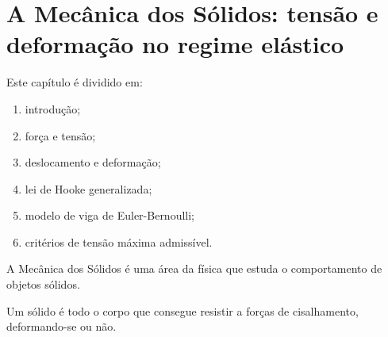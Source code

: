 \chapter{A Mecânica dos Sólidos: tensão e deformação no regime elástico}

Este capítulo é dividido em:
\begin{enumerate}
    \item introdução;
    \item força e tensão;
    \item deslocamento e deformação;
    \item lei de Hooke generalizada;
    \item modelo de viga de Euler-Bernoulli;
    \item critérios de tensão máxima admissível.
\end{enumerate}


A Mecânica dos Sólidos é uma área da física que estuda o comportamento de objetos sólidos.

Um sólido é todo o corpo que consegue resistir a forças de cisalhamento, deformando-se ou não. 